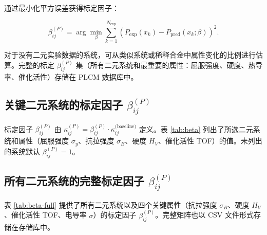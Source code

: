 \documentclass[12pt,a4paper]{article}
\begin{document}
	通过最小化平方误差获得标定因子：
	
	\begin{equation}
		\beta_{ij}^{(P)} = \arg\min_{\beta} \sum_{k=1}^{N_{\text{exp}}} \left( P_{\text{exp}}(x_k) - P_{\text{pred}}(x_k;\beta) \right)^2.
		\label{eq:beta-optimization}
	\end{equation}
	
	对于没有二元实验数据的系统，可从类似系统或稀释合金中属性变化的比例进行估算。完整的标定 \(\beta_{ij}^{(P)}\) 集（所有二元系统和最重要的属性：屈服强度、硬度、热导率、催化活性）存储在 PLCM 数据库中。
	
	\subsection{关键二元系统的标定因子 \(\beta_{ij}^{(P)}\)}
	\label{subsec:beta-table}
	
	标定因子 \(\beta_{ij}^{(P)}\) 由 \(\kappa_{ij}^{(P)} = \beta_{ij}^{(P)} \cdot \kappa_{ij}^{\text{(baseline)}}\) 定义。表 \ref{tab:beta} 列出了所选二元系统和属性（屈服强度 \(\sigma_y\)、抗拉强度 \(\sigma_B\)、硬度 \(H_V\)、催化活性 TOF）的值。未列出的系统默认 \(\beta_{ij}^{(P)} = 1\)。
	
	\subsection{所有二元系统的完整标定因子 \(\beta_{ij}^{(P)}\)}
	\label{subsec:beta-full}
	
	表 \ref{tab:beta-full} 提供了所有二元系统以及四个关键属性（抗拉强度 \(\sigma_B\)、硬度 \(H_V\)、催化活性 TOF、电导率 \(\sigma\)）的标定因子 \(\beta_{ij}^{(P)}\)。完整矩阵也以 CSV 文件形式存储在存储库中。
	
\end{document}
